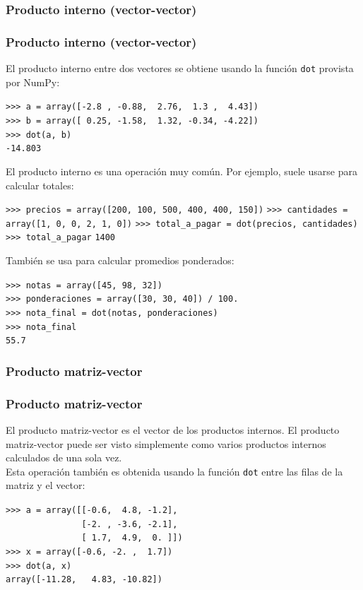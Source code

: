\subsubsection{Producto interno (vector-vector)}
\begin{frame}[fragile]
\frametitle{Producto interno (vector-vector)}
El producto interno entre dos vectores se obtiene usando la funci\'{o}n \texttt{dot} provista por NumPy:
\fontsize{12}{12}\selectfont
\begin{exampleblock}{}
\verb|>>> a = array([-2.8 , -0.88,  2.76,  1.3 ,  4.43])| \\
\verb|>>> b = array([ 0.25, -1.58,  1.32, -0.34, -4.22])| \\
\pause
\verb|>>> dot(a, b)| \\
\pause
\verb|-14.803|
\end{exampleblock}
\end{frame}
\begin{frame}[fragile]
El producto interno es una operaci\'{o}n muy com\'{u}n. Por ejemplo, suele usarse para calcular totales:
\fontsize{12}{12}\selectfont
\begin{exampleblock}{}
\verb|>>> precios = array([200, 100, 500, 400, 400, 150])|
\verb|>>> cantidades = array([1, 0, 0, 2, 1, 0])|
\pause
\verb|>>> total_a_pagar = dot(precios, cantidades)|
\pause
\verb|>>> total_a_pagar|
\pause
\verb|1400|
\end{exampleblock}
Tambi\'{e}n se usa para calcular promedios ponderados:
\begin{exampleblock}{}
\verb|>>> notas = array([45, 98, 32])| \\
\pause
\verb|>>> ponderaciones = array([30, 30, 40]) / 100.| \\
\pause
\verb|>>> nota_final = dot(notas, ponderaciones)| \\
\pause
\verb|>>> nota_final| \\
\verb|55.7|
\end{exampleblock}
\end{frame}
\subsubsection{Producto matriz-vector}
\begin{frame}[fragile]
\frametitle{Producto matriz-vector}
El producto matriz-vector es el vector de los productos internos. El producto matriz-vector puede ser visto simplemente como varios productos internos calculados de una sola vez.
\\
\bigskip
Esta operaci\'{o}n tambi\'{e}n es obtenida usando la funci\'{o}n \texttt{dot} entre las filas de la matriz y el vector:
\fontsize{12}{12}\selectfont
\begin{exampleblock}{}
\verb|>>> a = array([[-0.6,  4.8, -1.2],| \\
\verb|               [-2. , -3.6, -2.1],| \\
\verb|               [ 1.7,  4.9,  0. ]])| \\
\verb|>>> x = array([-0.6, -2. ,  1.7])| \\
\pause
\verb|>>> dot(a, x)| \\
\pause
\verb|array([-11.28,   4.83, -10.82])|
\end{exampleblock}
\end{frame}
